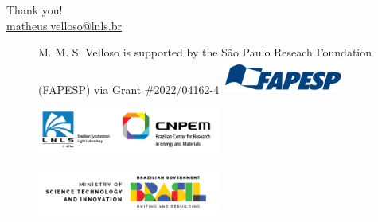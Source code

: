 \documentclass[aspectratio=169]{beamer}
\begin{document}
\begin{frame}
    Thank you!\\
    \vfill
    \url{matheus.velloso@lnls.br}\\
    \vfill
    \begin{figure}
        \centering
        \scriptsize
        M. M. S. Velloso is supported by the São Paulo Reseach Foundation (FAPESP) via Grant \#2022/04162-4
        \includegraphics[width=4cm]{fapesp.png}
    \end{figure}
    \begin{minipage}{0.49\textwidth}
        \begin{figure}
            \includegraphics[width=6cm]{cnpem_lnls.png}
        \end{figure}
    \end{minipage}
    \begin{minipage}{0.49\textwidth}
        \begin{figure}
            \includegraphics[width=6cm]{mcti.png}
        \end{figure}
    \end{minipage}
    \vfill

\end{frame}
\end{document}
